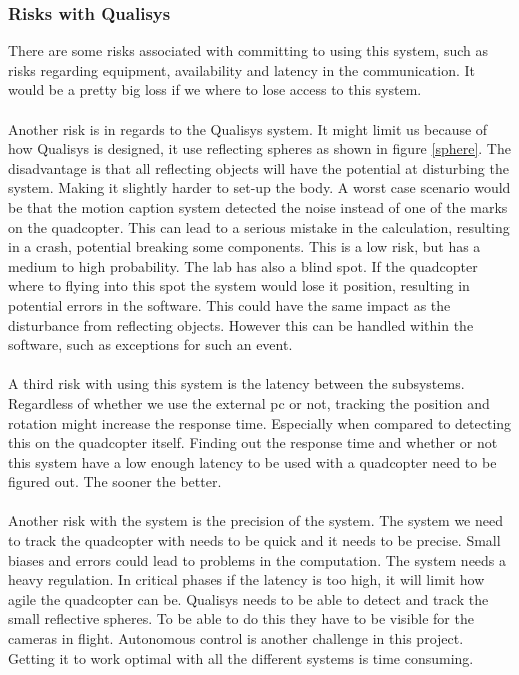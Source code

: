 \subsubsection{Risks with Qualisys}
There are some risks associated with committing to using this system, such as risks regarding equipment, availability and latency in the communication. It would be a pretty big loss if we where to lose access to this system. 
\\\\
Another risk is in regards to the Qualisys system. It might limit us because of how Qualisys is designed, it use reflecting spheres as shown in figure \ref{sphere}. The disadvantage is that all reflecting objects will have the potential at disturbing the system. Making it slightly harder to set-up the body. A worst case scenario would be that the motion caption system detected the noise instead of one of the marks on the quadcopter. This can lead to a serious mistake in the calculation, resulting in a crash, potential breaking some components. This is a low risk, but has a medium to high probability. The lab has also a blind spot. If the quadcopter where to flying into this spot the system would lose it position, resulting in potential errors in the software. This could have the same impact as the disturbance from reflecting objects. However this can be handled within the software, such as exceptions for such an event. 
\\\\
A third risk with using this system is the latency between the subsystems. Regardless of whether we use the external pc or not, tracking the position and rotation might increase the response time. Especially when compared to detecting this on the quadcopter itself. Finding out the response time and whether or not this system have a low enough latency to be used with a quadcopter need to be figured out. The sooner the better. 
\\\\
Another risk with the system is the precision of the system. The system we need to track the quadcopter with needs to be quick and it needs to be precise. Small biases and errors could lead to problems in the computation. The system needs a heavy regulation. In critical phases if the latency is too high, it will limit how agile the quadcopter can be. Qualisys needs to be able to detect and track the small reflective spheres. To be able to do this they have to be visible for the cameras in flight. Autonomous control is another challenge in this project. Getting it to work optimal with all the different systems is time consuming. 


